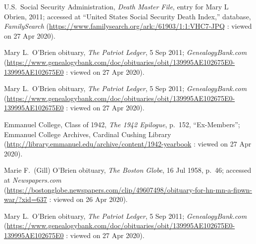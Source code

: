 \begin{thebibliography}{999}
U.S.\ Social Security Administration, \textit{Death Master File}, entry for Mary L Obrien, 2011; accessed at ``United States Social Security Death Index,'' database, \textit{FamilySearch} (\url{https://www.familysearch.org/ark:/61903/1:1:VHC7-JPQ} : viewed on 27 Apr 2020).

Mary L.\ O'Brien obituary, \textit{The Patriot Ledger}, 5 Sep 2011; \textit{GenealogyBank.com} (\url{https://www.genealogybank.com/doc/obituaries/obit/139995AE102675E0-139995AE102675E0} : viewed on 27 Apr 2020).

Mary L.\ O'Brien obituary, \textit{The Patriot Ledger}, 5 Sep 2011; \textit{GenealogyBank.com} (\url{https://www.genealogybank.com/doc/obituaries/obit/139995AE102675E0-139995AE102675E0} : viewed on 27 Apr 2020).

Emmanuel College, Class of 1942, \textit{The 1942 Epilogue}, p.\ 152, ``Ex-Members''; Emmanuel College Archives, Cardinal Cushing Library (\url{http://library.emmanuel.edu/archive/content/1942-yearbook} : viewed on 27 Apr 2020).

Marie F.\ (Gill) O'Brien obituary, \textit{The Boston Globe}, 16 Jul 1958, p.\ 46; accessed at \textit{Newspapers.com} (\url{https://bostonglobe.newspapers.com/clip/49607498/obituary-for-hn-mn-a-fipwn-war/?xid=637} : viewed on 26 Apr 2020).

Mary L.\ O'Brien obituary, \textit{The Patriot Ledger}, 5 Sep 2011; \textit{GenealogyBank.com} (\url{https://www.genealogybank.com/doc/obituaries/obit/139995AE102675E0-139995AE102675E0} : viewed on 27 Apr 2020).
	
\end{thebibliography}